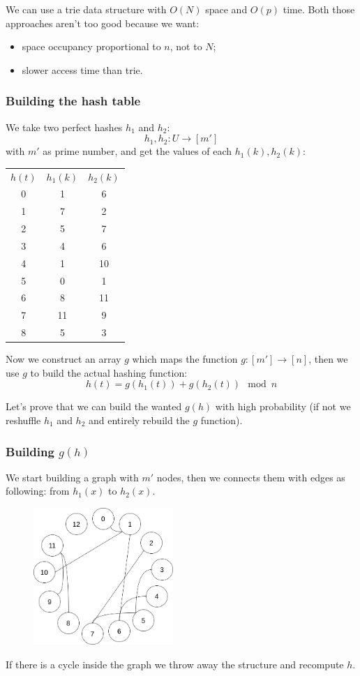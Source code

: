 We can use a trie data structure with $O(N)$ space and $O(p)$ time.
Both those approaches aren't too good because we want: 
\begin{itemize}
    \item space occupancy proportional to $n$, not to $N$;
    \item slower access time than trie.
\end{itemize}

\subsubsection{Building the hash table}
We take two perfect hashes $h_1$ and $h_2$:
$$
    h_1, h_2 : U \xrightarrow{} [m'] 
$$
with $m'$ as prime number, and get the values of each $h_1(k), h_2(k)$:
\begin{table}[H]
    \centering
    \begin{tabular}{c|c|c}
        $h(t)$ & $h_1(k)$ & $h_2(k)$ \\
        0 & 1 & 6 \\
        1 & 7 & 2 \\
        2 & 5 & 7 \\
        3 & 4 & 6 \\
        4 & 1 & 10 \\
        5 & 0 & 1 \\
        6 & 8 & 11 \\
        7 & 11 & 9 \\
        8 & 5 & 3 \\
    \end{tabular}
\end{table}

Now we construct an array $g$ which maps the function $g : [m'] \xrightarrow{} [n]$, then we use $g$ to build the actual hashing function:
$$
    h(t) = g(h_1(t)) + g(h_2(t)) \mod n
$$

Let's prove that we can build the wanted $g(h)$ with high probability (if not we reshuffle $h_1$ and $h_2$ and entirely rebuild the $g$ function).

\subsubsection{Building $g(h)$}
We start building a graph with $m'$ nodes, then we connects them with edges as following: from $h_1(x)$ to $h_2(x)$.
\begin{figure}[H]
    \centering
    \includegraphics[width=200px]{images/7_Hashing/mophf_graph.png}
\end{figure}
If there is a cycle inside the graph we throw away the structure and recompute $h$.

